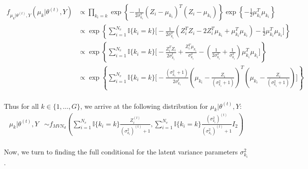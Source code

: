 \documentclass{article}
\begin{document}
\begin{align*}
f_{\mu_{k}|\theta^{(t)}, Y}(\mu_k|\theta^{(t)},Y) &\propto \prod_{k_i = k} \exp\left\{-\frac{1}{2\sigma_{k_i}^2}(Z_i - \mu_{k_i})^T(Z_i - \mu_{k_i})\right\}\exp\left\{-\frac{1}{2}\mu_{k_i}^T\mu_{k_i}\right\}\\
&\propto \exp\left\{\sum_{i = 1}^{N_v}\mathbb{I}\{k_i = k\} \Big[-\frac{1}{2\sigma_{k_i}^2}(Z_i^TZ_i - 2Z_i^T\mu_{k_i} + \mu_{k_i}^T\mu_{k_i}) - \frac{1}{2}\mu_{k_i}^T\mu_{k_i} \Big]\right\}\\
&\propto\exp\left\{\sum_{i = 1}^{N_v}\mathbb{I}\{k_i = k\} \Big[-\frac{Z_i^TZ_i}{2\sigma_{k_i}^t} + \frac{Z_i^T\mu_{k_i}}{\sigma_{k_i}^2} - \left(\frac{1}{2\sigma_{k_i}^2} + \frac{1}{\sigma_{k_i}^2}\right)\mu_{k_i}^T\mu_{k_i} \Big] \right\}\\
&\propto\exp\left\{\sum_{i = 1}^{N_v}\mathbb{I}\{k_i = k\} \Big[-\frac{(\sigma_{k_i}^2+1)}{2\sigma_{k_i}^t}\left(\mu_{k_i}-\frac{Z_i}{(\sigma_{k_i}^2+1)}\right)^T\left(\mu_{k_i}-\frac{Z_i}{(\sigma_{k_i}^2+1)}\right)\Big]\right\}\\
\end{align*}

Thus for all $k \in \{1, \ldots, G\}$, we arrive at the following distribution for $\mu_k | \theta^{(t)}, Y$:
\begin{align*}
\mu_{k}|\theta^{(t)},Y&\sim f_{{MVN}_d} \left(\sum_{i = 1}^{N_v}\mathbb{I}\{k_i = k\}\frac{Z_i^{(t)}}{(\sigma_{k_i}^2)^{(t)}+1}, \sum_{i = 1}^{N_v}\mathbb{I}\{k_i = k\}\frac{(\sigma_{k_i}^2)^{(t)}}{(\sigma_{k_i}^2)^{(t)}+1}I_2\right)\\
\end{align*}

Now, we turn to finding the full conditional for the latent variance parameters $\sigma_{k_i}^2$. 
\end{document}

